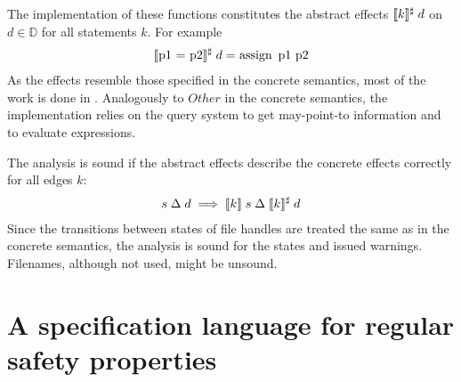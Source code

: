 The implementation of these functions constitutes the abstract effects $\llbracket k \rrbracket^\sharp \; d$ on $d \in \mathbb{D}$ for all statements $k$. For example
\begin{align}
\absEfT{p1 = p2}{d} = \text{\inlineML{assign p1 p2}}
\end{align}
As the effects resemble those specified in the concrete semantics, most of the work is done in . Analogously to $Other$ in the concrete semantics, the implementation relies on the query system to get may-point-to information and to evaluate expressions.

The analysis is sound if the abstract effects describe the concrete effects correctly for all edges $k$:
\begin{align}
s \;\Delta\; d \implies \llbracket k \rrbracket \; s \;\Delta\; \llbracket k \rrbracket^\sharp \; d
\end{align}
Since the transitions between states of file handles are treated the same as in the concrete semantics, the analysis is sound for the states and issued warnings. Filenames, although not used, might be unsound.



\chapter{A specification language for regular safety properties}
